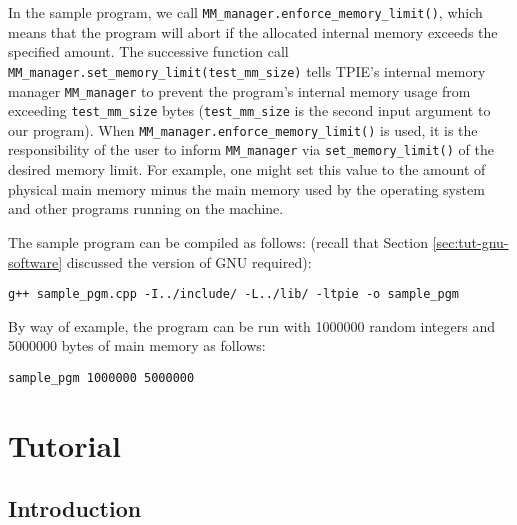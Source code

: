In the sample program, we call
\lstinline|MM_manager.enforce_memory_limit()|, which means that the
program will abort if the allocated internal memory exceeds the
specified amount. The successive function call
\lstinline|MM_manager.set_memory_limit(test_mm_size)| tells TPIE's
internal memory manager \lstinline|MM_manager| to prevent the
program's internal memory usage from exceeding
\lstinline|test_mm_size| bytes (\lstinline|test_mm_size| is
the second input argument to our program). When
\lstinline|MM_manager.enforce_memory_limit()| is used, it is the
responsibility of the user to inform \lstinline|MM_manager| via
\lstinline|set_memory_limit()| of the desired memory limit.  For
example, one might set this value to the amount of physical main
memory minus the main memory used by the operating system and other
programs running on the machine.


The sample program can be compiled as follows: (recall that Section
\ref{sec:tut-gnu-software} discussed the version of GNU \CPP{} required):

\begin{lstlisting}
g++ sample_pgm.cpp -I../include/ -L../lib/ -ltpie -o sample_pgm
\end{lstlisting}

By way of example, the program can be run with 1000000 random integers
and 5000000 bytes of main memory as follows:
\begin{lstlisting}
sample_pgm 1000000 5000000
\end{lstlisting}


\chapter{Tutorial}

\section{Introduction}

